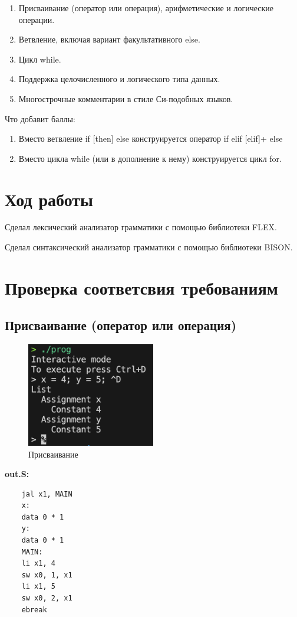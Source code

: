 \documentclass[12pt,onecolumn]{article}
\begin{document}
\begin{enumerate}
    \item Присваивание (оператор или операция), арифметические и логические операции.
    \item Ветвление, включая вариант факультативного else.
    \item Цикл while.
    \item Поддержка целочисленного и логического типа данных.
    \item Многострочные комментарии в стиле Си-подобных языков.
\end{enumerate}

Что добавит баллы:
\begin{enumerate}
    \item Вместо ветвление if [then] else конструируется
          оператор if elif [elif]+ else
    \item Вместо цикла while (или в дополнение к нему) конструируется цикл for.
\end{enumerate}

\section{Ход работы}
Сделал лексический анализатор грамматики с помощью библиотеки FLEX.

Сделал синтаксический анализатор грамматики с помощью библиотеки BISON.


\section{Проверка соответсвия требованиям}
\subsection{Присваивание (оператор или операция)}
\begin{figure}[H]
    \centering
    \includegraphics[width=0.5\textwidth]{image/asgn.png}
    \caption{Присваивание}
\end{figure}
\textbf{out.S:}
\begin{verbatim}
    jal x1, MAIN
    x:
    data 0 * 1
    y:
    data 0 * 1
    MAIN:
    li x1, 4
    sw x0, 1, x1
    li x1, 5
    sw x0, 2, x1
    ebreak
\end{verbatim}
\end{document}
